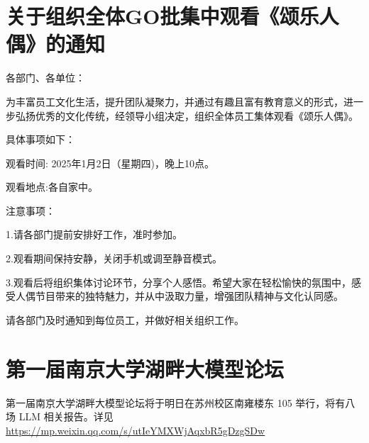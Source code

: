 \documentclass[letterpaper, 12pt]{article}
\begin{document}
\begin{multicols}{2}
\section{关于组织全体GO批集中观看《颂乐人偶》的通知}
各部门、各单位：

为丰富员工文化生活，提升团队凝聚力，并通过有趣且富有教育意义的形式，进一步弘扬优秀的文化传统，经领导小组决定，组织全体员工集体观看《颂乐人偶》。

具体事项如下：

观看时间: 2025年1月2日（星期四)，晚上10点。

观看地点:各自家中。

注意事项：

1.请各部门提前安排好工作，准时参加。

2.观看期间保持安静，关闭手机或调至静音模式。

3.观看后将组织集体讨论环节，分享个人感悟。希望大家在轻松愉快的氛围中，感受人偶节目带来的独特魅力，并从中汲取力量，增强团队精神与文化认同感。

请各部门及时通知到每位员工，并做好相关组织工作。

\section{第一届南京大学湖畔大模型论坛}
第一届南京大学湖畔大模型论坛将于明日在苏州校区南雍楼东 105 举行，将有八场 LLM 相关报告。详见\url{https://mp.weixin.qq.com/s/utIeYMXWjAqxbR5gDzgSDw}
\end{multicols} 
\end{document}
